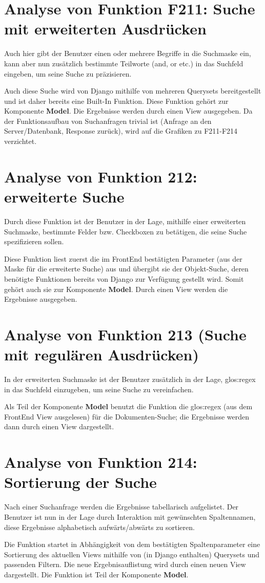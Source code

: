 \section{Analyse von Funktion F211: Suche mit erweiterten Ausdrücken}
Auch hier gibt der Benutzer einen oder mehrere Begriffe in die Suchmaske ein, kann aber nun zusätzlich bestimmte Teilworte (and, or etc.) in das Suchfeld eingeben, um seine Suche zu präzisieren.  

Auch diese Suche wird von Django mithilfe von mehreren Querysets bereitgestellt und ist daher bereits eine Built-In Funktion. Diese Funktion gehört zur Komponente \textbf{Model}. Die Ergebnisse werden durch einen View ausgegeben. 
Da der Funktionsaufbau von Suchanfragen trivial ist (Anfrage an den Server/Datenbank, Response zurück), wird auf die Grafiken zu F211-F214 verzichtet.   

\section{Analyse von Funktion 212: erweiterte Suche}
Durch diese Funktion ist der Benutzer in der Lage, mithilfe einer erweiterten Suchmaske, bestimmte Felder bzw. Checkboxen zu betätigen, die seine Suche spezifizieren sollen.
    
Diese Funktion liest zuerst die im FrontEnd bestätigten Parameter (aus der Maske für die erweiterte Suche) aus und übergibt sie der Objekt-Suche, deren benötigte Funktionen bereits von Django zur Verfügung gestellt wird. Somit gehört auch sie zur Komponente \textbf{Model}. Durch einen View werden die Ergebnisse ausgegeben. 

\section{Analyse von Funktion 213 (Suche mit regulären Ausdrücken)}
In der erweiterten Suchmaske ist der Benutzer zusätzlich in der Lage, \gls{glos:regex} in das Suchfeld einzugeben, um seine Suche zu vereinfachen. 

Als Teil der Komponente \textbf{Model} benutzt die Funktion die \gls{glos:regex} (aus dem FrontEnd View ausgelesen) für die Dokumenten-Suche; die Ergebnisse werden dann durch einen View dargestellt.
 
\section{Analyse von Funktion 214: Sortierung der Suche}
Nach einer Suchanfrage werden die Ergebnisse tabellarisch aufgelistet. Der Benutzer ist nun in der Lage durch Interaktion mit gewünschten Spaltennamen, diese Ergebnisse alphabetisch aufwärts/abwärts zu sortieren. 

Die Funktion startet in Abhängigkeit von dem bestätigten Spaltenparameter eine Sortierung des aktuellen Views mithilfe von (in Django enthalten) Querysets und passenden Filtern. Die neue Ergebnisauflistung wird durch einen neuen View dargestellt. Die Funktion ist Teil der Komponente \textbf{Model}. 




 